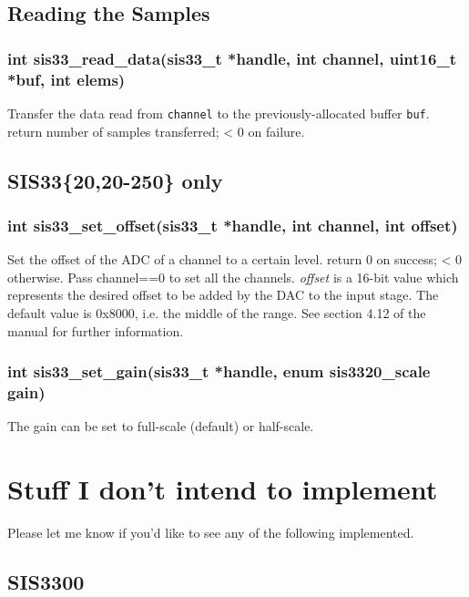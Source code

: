 \documentclass[12pt,a4paper]{article}
\begin{document}
\subsection*{Reading the Samples}
\label{sec-2.5}

\subsubsection*{int sis33\_read\_data(sis33\_t *handle, int channel,
  uint16\_t *buf, int elems)}
\label{sec-2.5.1}

Transfer the data read from \verb~channel~ to the previously-allocated
buffer \verb~buf~. \\
return number of samples transferred; < 0 on failure.

\subsection*{SIS33\{20,20-250\} only}
\label{sec-2.6}

\subsubsection*{int sis33\_set\_offset(sis33\_t *handle, int channel, int offset)}
\label{sec-2.6.1}

Set the offset of the ADC of a channel to a certain level.
return 0 on success; < 0 otherwise.
Pass channel==0 to set all the channels.
\emph{offset} is a 16-bit value which represents the desired offset to be added
by the DAC to the input stage. The default value is 0x8000, i.e. the middle
of the range. See section 4.12 of the manual for further information.

\subsubsection*{int sis33\_set\_gain(sis33\_t *handle, enum sis3320\_scale gain)}
\label{sec-2.6.2}

The gain can be set to full-scale (default) or half-scale.

\section*{Stuff I don't intend to implement}
\label{sec-3}

Please let me know if you'd like to see any of the following implemented.

\subsection*{SIS3300}
\label{sec-3.1}
\end{document}

